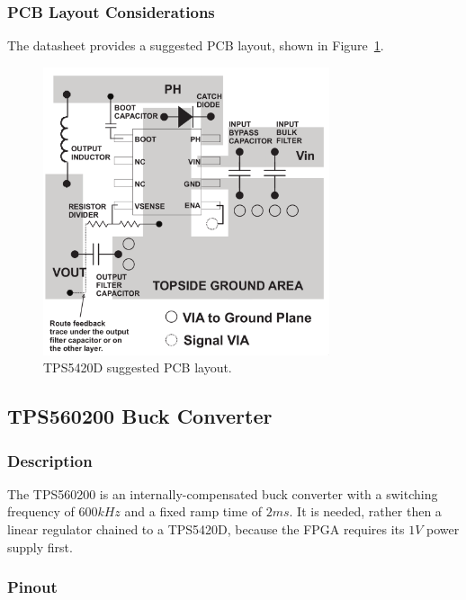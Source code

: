 \subsubsection{PCB Layout Considerations}
\label{sec:tps5420d-pcb}

The datasheet provides a suggested PCB layout, shown in Figure~\ref{fig:tps5420d-pcb}.

\begin{figure}[h]
        \centering
        \includegraphics[width=0.75\textwidth]{data/tps5420d-pcb.png}
        \caption{TPS5420D suggested PCB layout.}
        \label{fig:tps5420d-pcb}
\end{figure}

\subsection{TPS560200 Buck Converter}
\label{sec:tps560200}

\subsubsection{Description}
\label{sec:tps560200-description}

The TPS560200 is an internally-compensated buck converter with a switching frequency of
$600 \si{kHz}$ and a fixed ramp time of $2 \si{ms}$. It is needed, rather then a linear regulator
chained to a TPS5420D, because the FPGA requires its $1 \si{V}$ power supply first.

\subsubsection{Pinout}
\label{sec:tps560200-pinout}

